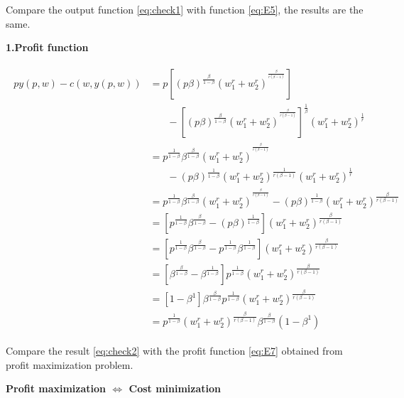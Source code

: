 \documentclass{article}
\begin{document}
Compare the output function \ref{eq:check1} with function \ref{eq:E5}, the results are the same.

\textbf{1.Profit function}

\begin{align}
\begin{split}
py(p,w) - c(w, y(p,w)) &= p[(p \beta)^{\frac{\beta}{1- \beta}} (w_1^r + w_2^r)^{^{\frac{\beta}{r(\beta - 1)}}}] \\ 
&\ \ \ \ \ \ \ \ - [(p \beta)^{\frac{\beta}{1- \beta}} (w_1^r + w_2^r)^{^{\frac{\beta}{r(\beta - 1)}}}]^{\frac{1}{\beta}}{(w_1^r + w_2^r)^{\frac{1}{r}}} \\
&= p^{\frac{1}{1- \beta}} \beta^{\frac{\beta}{1- \beta}}(w_1^r + w_2^r)^{^{\frac{\beta}{r(\beta - 1)}}} \\ 
&\ \ \ \ \ \ \ \ - (p\beta)^{\frac{1}{1- \beta}} (w_1^r + w_2^r)^{\frac{1}{r(\beta - 1)}}(w_1^r + w_2^r)^{\frac{1}{r}} \\
&= p^{\frac{1}{1- \beta}} \beta^{\frac{\beta}{1- \beta}}(w_1^r + w_2^r)^{^{\frac{\beta}{r(\beta - 1)}}} - (p\beta)^{\frac{1}{1- \beta}} (w_1^r + w_2^r)^{\frac{\beta}{r(\beta - 1)}} \\
&= [p^{\frac{1}{1- \beta}} \beta^{\frac{\beta}{1- \beta}} - (p\beta)^{\frac{1}{1- \beta}}] (w_1^r + w_2^r)^{\frac{\beta}{r(\beta - 1)}} \\
&= [p^{\frac{1}{1- \beta}} \beta^{\frac{\beta}{1- \beta}} - p^{\frac{1}{1- \beta}} \beta^{\frac{1}{1- \beta}}] (w_1^r + w_2^r)^{\frac{\beta}{r(\beta - 1)}} \\
&= [ \beta^{\frac{\beta}{1- \beta}} -\beta^{\frac{1}{1- \beta}}] p^{\frac{1}{1- \beta}}(w_1^r + w_2^r)^{\frac{\beta}{r(\beta - 1)}} \\
&= [ 1 -\beta^1] \beta^{\frac{\beta}{1- \beta}} p^{\frac{1}{1- \beta}}(w_1^r + w_2^r)^{\frac{\beta}{r(\beta - 1)}} \\
&= p^{\frac{1}{1- \beta}}(w_1^r + w_2^r)^{\frac{\beta}{r(\beta - 1)}} \beta^{\frac{\beta}{1- \beta}}(1 -\beta^1)
\end{split}
\label{eq:check2}   
\end{align}

Compare the result \ref{eq:check2} with the profit function \ref{eq:E7} obtained from profit maximization problem.

\begin{center}
\textbf{Profit maximization $\iff$  Cost minimization}
\end{center}

\end{document}
